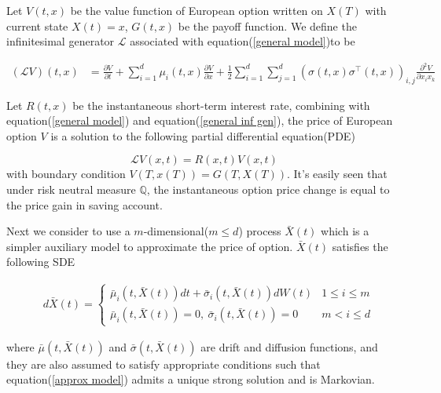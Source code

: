 Let $V(t,x)$ be the value function of European option written on $X(T)$ with current state $X(t)=x$, $G(t, x)$ be the payoff function. We define the infinitesimal generator $\mathcal{L}$ associated with equation(\ref{general model})to be

\begin{equation}\label{general inf gen}
    \begin{aligned}
        (\mathcal{L} V)(t, x)&=\frac{\partial V}{\partial t} + \sum_{i=1}^{d} \mu_i(t, x) \frac{\partial V}{\partial x}+\frac{1}{2} \sum_{i=1}^{d}\sum_{j=1}^{d} (\sigma(t,x) \sigma^{\intercal}(t,x))_{i,j} \frac{\partial^2 V}{\partial x_i x_k}
    \end{aligned}
\end{equation}

Let $R(t,x)$ be the instantaneous short-term interest rate, combining with equation(\ref{general model}) and equation(\ref{general inf gen}), the price of European option $V$ is a solution to the following partial differential equation(PDE)

\begin{equation}\label{pde under general}
    \mathcal{L}V(x,t) = R(x,t)V(x,t)
\end{equation}
\noindent with boundary condition $V(T,x(T)) = G(T,X(T))$. It's easily seen that under risk neutral measure $\mathbb Q$, the instantaneous option price change is equal to the price gain in saving account. 

Next we consider to use a $m$-dimensional($m \leq d$) process $\bar{X}(t)$ which is a simpler auxiliary model to approximate the price of option. $\bar{X}(t)$ satisfies the following SDE

\begin{equation}\label{approx model}
    \begin{aligned}
        &d\bar{X}(t)= \begin{cases}   \bar{\mu}_i(t, \bar{X}(t)) dt + \bar{\sigma}_i(t, \bar{X}(t)) dW(t) & 1 \leq i \leq m \\
        \bar{\mu}_i(t, \bar{X}(t))=0, \ \bar{\sigma}_i(t, \bar{X}(t))=0 & m < i \leq d \end{cases}
        \end{aligned}
\end{equation}

\noindent where $\bar{\mu}(t, \bar{X}(t))$ and $\bar{\sigma}(t, \bar{X}(t))$ are drift and diffusion functions, and they are also assumed to satisfy appropriate conditions such that equation(\ref{approx model}) admits a unique strong solution and is Markovian.

